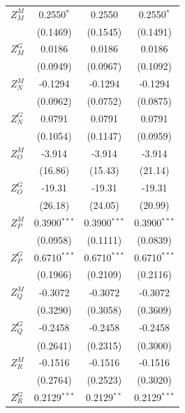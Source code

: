 \begin{tabular}{lccc}
   $Z^{M}_M$       & 0.2550$^{*}$    & 0.2550             & 0.2550$^{*}$\\   
                   & (0.1469)        & (0.1545)           & (0.1491)\\   
   $Z^{G}_M$       & 0.0186          & 0.0186             & 0.0186\\   
                   & (0.0949)        & (0.0967)           & (0.1092)\\   
   $Z^{M}_N$       & -0.1294         & -0.1294            & -0.1294\\   
                   & (0.0962)        & (0.0752)           & (0.0875)\\   
   $Z^{G}_N$       & 0.0791          & 0.0791             & 0.0791\\   
                   & (0.1054)        & (0.1147)           & (0.0959)\\   
   $Z^{M}_O$       & -3.914          & -3.914             & -3.914\\   
                   & (16.86)         & (15.43)            & (21.14)\\   
   $Z^{G}_O$       & -19.31          & -19.31             & -19.31\\   
                   & (26.18)         & (24.05)            & (20.99)\\   
   $Z^{M}_P$       & 0.3900$^{***}$  & 0.3900$^{***}$     & 0.3900$^{***}$\\   
                   & (0.0958)        & (0.1111)           & (0.0839)\\   
   $Z^{G}_P$       & 0.6710$^{***}$  & 0.6710$^{***}$     & 0.6710$^{***}$\\   
                   & (0.1966)        & (0.2109)           & (0.2116)\\   
   $Z^{M}_Q$       & -0.3072         & -0.3072            & -0.3072\\   
                   & (0.3290)        & (0.3058)           & (0.3609)\\   
   $Z^{G}_Q$       & -0.2458         & -0.2458            & -0.2458\\   
                   & (0.2641)        & (0.2315)           & (0.3000)\\   
   $Z^{M}_R$       & -0.1516         & -0.1516            & -0.1516\\   
                   & (0.2764)        & (0.2523)           & (0.3020)\\   
   $Z^{G}_R$       & 0.2129$^{***}$  & 0.2129$^{**}$      & 0.2129$^{***}$\\   

\end{tabular}
